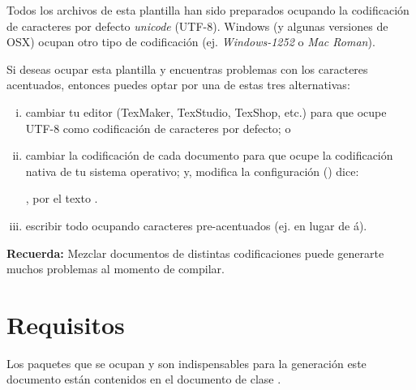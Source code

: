 Todos los archivos  de esta plantilla han sido preparados ocupando la codificación de caracteres por defecto \emph{unicode} (UTF-8). Windows (y algunas versiones de OSX) ocupan otro tipo de codificación (ej. \emph{Windows-1252} o \emph{Mac Roman}).

Si deseas ocupar esta plantilla y encuentras problemas con los caracteres acentuados, entonces puedes optar por una de estas tres alternativas:
\begin{enumerate}[(i)]
    \item cambiar tu editor (TexMaker, TexStudio, TexShop, etc.) para que ocupe UTF-8 como codificación de caracteres por defecto; o
    \item cambiar la codificación de cada documento  para que ocupe la codificación nativa de tu sistema operativo; y, modifica la configuración () dice:
    
    , por el texto .
    \item escribir todo ocupando caracteres pre-acentuados (ej.  en lugar de á).
\end{enumerate}

\vspace{10mm}
\begin{framed}
    \textbf{Recuerda:} Mezclar documentos de distintas codificaciones puede generarte muchos problemas al momento de compilar.  
\end{framed}


\section{Requisitos}
Los paquetes que se ocupan y son indispensables para la generación este documento están contenidos en el documento de clase .

